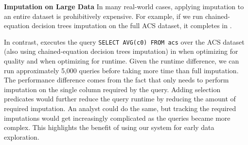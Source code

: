 {\textbf{Imputation on Large Data}\quad
In many real-world cases, applying imputation to an entire dataset is prohibitively expensive.
For example, if we run chained-equation decision trees imputation on the full ACS dataset, it completes in \acsbaseresultminutes{}.

In contrast, \ProjectName{} executes the query \lstinline{SELECT AVG(c0) FROM acs} over the ACS dataset (also using chained-equation decision trees imputation) in \acsimputedbzeroresult{} when optimizing for quality and \acsimputedboneresult{} when optimizing for runtime. 
Given the runtime difference, we can run approximately 5,000 queries before taking more time than full imputation.
The performance difference comes from the fact that \ProjectName{} only needs to perform imputation on the single column required by the query.
Adding selection predicates would further reduce the query runtime by reducing the amount of required imputation.
An analyst could do the same, but tracking the required imputations would get increasingly complicated as the queries became more complex.
This highlights the benefit of using our system for early data exploration.
}



